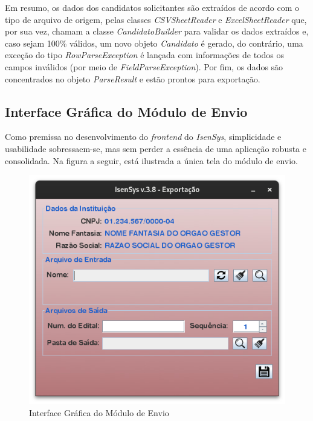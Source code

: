 \documentclass[
	12pt,			%
	openright,		%
	oneside,	
	a4paper,		%
	english,		%
	brazil			%
]{abntex2/abntex2}  %
\begin{document}
	Em resumo, os dados dos candidatos solicitantes são extraídos de acordo com o tipo de arquivo de origem, pelas classes \textit{CSVSheetReader} e \textit{ExcelSheetReader} que, por sua vez, chamam a classe \textit{CandidatoBuilder} para validar os dados extraídos e, caso sejam 100\% válidos, um novo objeto \textit{Candidato} é gerado, do contrário, uma exceção do tipo \textit{RowParseException} é lançada com informações de todos os campos inválidos (por meio de \textit{FieldParseException}). Por fim, os dados são concentrados no objeto \textit{ParseResult} e estão prontos para exportação.
	
	\subsection{Interface Gráfica do Módulo de Envio}
	
	Como premissa no desenvolvimento do \textit{frontend} do \textit{IsenSys}, simplicidade e usabilidade sobressaem-se, mas sem perder a essência de uma aplicação robusta e consolidada. Na figura a seguir, está ilustrada a única tela do módulo de envio.
	
	\begin{figure}[H]
		\begin{center}
			
			\caption{Interface Gráfica do Módulo de Envio}
			\label{envio-ui}
			
			\includegraphics[scale=0.5]{img/envio-ui}
			
		\end{center}
	\end{figure}
	
\end{document}
